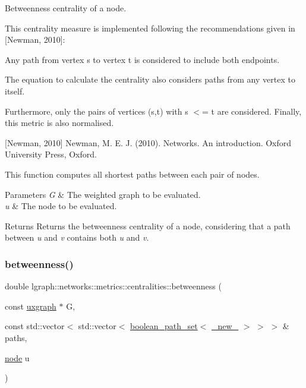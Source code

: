 Betweenness centrality of a node. 

This centrality measure is implemented following the recommendations given in \mbox{[}Newman, 2010\mbox{]}\+:
\begin{DoxyItemize}
\item Any path from vertex \textquotesingle{}s\textquotesingle{} to vertex \textquotesingle{}t\textquotesingle{} is considered to include both endpoints.
\item The equation to calculate the centrality also considers paths from any vertex to itself.
\end{DoxyItemize}

Furthermore, only the pairs of vertices (s,t) with s $<$= t are considered. Finally, this metric is also normalised.

\mbox{[}Newman, 2010\mbox{]} Newman, M. E. J. (2010). Networks. An introduction. Oxford University Press, Oxford.

This function computes all shortest paths between each pair of nodes.


\begin{DoxyParams}{Parameters}
{\em G} & The weighted graph to be evaluated. \\
\hline
{\em u} & The node to be evaluated. \\
\hline
\end{DoxyParams}
\begin{DoxyReturn}{Returns}
Returns the betweenness centrality of a node, considering that a path between {\itshape u} and {\itshape v} contains both {\itshape u} and {\itshape v}. 
\end{DoxyReturn}
\mbox{\label{namespacelgraph_1_1networks_1_1metrics_1_1centralities_a9c5f210ed96ff6bcb1dfb45aaba3f947}} 
\subsubsection{\texorpdfstring{betweenness()}{betweenness()}\hspace{0.1cm}{\footnotesize\ttfamily [3/8]}}
{\footnotesize\ttfamily double lgraph\+::networks\+::metrics\+::centralities\+::betweenness (\begin{DoxyParamCaption}\item[{const \hyperlink{classlgraph_1_1uxgraph}{uxgraph} $\ast$}]{G,  }\item[{const std\+::vector$<$ std\+::vector$<$ \hyperlink{namespacelgraph_afad432931ba600ab1628d5c9595986c5}{boolean\+\_\+path\+\_\+set}$<$ \hyperlink{namespacelgraph_a2836f966c1c36b43da337d8907728ec0}{\+\_\+new\+\_\+} $>$ $>$ $>$ \&}]{paths,  }\item[{\hyperlink{namespacelgraph_a397169dd66adf725210a30fb7251773e}{node}}]{u }\end{DoxyParamCaption})}



